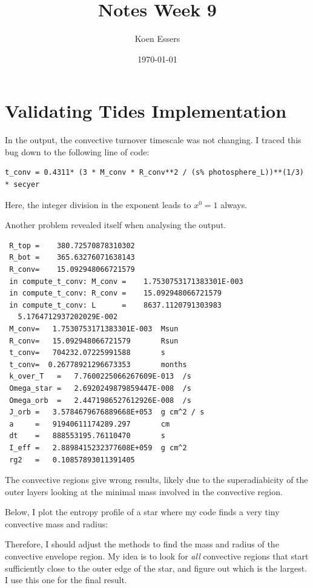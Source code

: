 \documentclass[a4paper,10pt]{article}
\title{Notes Week 9}
\author{Koen Essers}
\date{\today}
\begin{document}
\setuplayout
\section{Validating Tides Implementation}

In the output, the convective turnover timescale was not changing. I traced this bug down to the following line of code:
\begin{verbatim}
t_conv = 0.4311* (3 * M_conv * R_conv**2 / (s% photosphere_L))**(1/3) * secyer
\end{verbatim}
Here, the integer division in the exponent leads to \(x^0 = 1\) always.

Another problem revealed itself when analysing the output.
\begin{verbatim}
 R_top =    380.72570878310302     
 R_bot =    365.63276071638143     
 R_conv=    15.092948066721579     
 in compute_t_conv: M_conv =    1.7530753171383301E-003
 in compute_t_conv: R_conv =    15.092948066721579     
 in compute_t_conv: L      =    8637.1120791303983     
   5.1764712937202029E-002
 M_conv=   1.7530753171383301E-003  Msun
 R_conv=   15.092948066721579       Rsun
 t_conv=   704232.07225991588       s
 t_conv=  0.26778921296673353       months
 k_over_T   =   7.7600225066267609E-013  /s
 Omega_star =   2.6920249879859447E-008  /s
 Omega_orb  =   2.4471986527612926E-008  /s
 J_orb =   3.5784679676889668E+053  g cm^2 / s
 a     =   91940611174289.297       cm
 dt    =   888553195.76110470       s
 I_eff =   2.8898415232377608E+059  g cm^2
 rg2   =   0.10857893011391405     
\end{verbatim}

The convective regions give wrong results, likely due to the superadiabicity of the outer layers looking at the minimal mass involved in the convective region.

Below, I plot the entropy profile of a star where my code finds a very tiny convective mass and radius:
\begin{figure}[ht]
    \centering
\end{figure}

Therefore, I should adjust the methods to find the mass and radius of the convective envelope region.
My idea is to look for \emph{all} convective regions that start sufficiently close to the outer edge of the star, and figure out which is the largest. I use this one for the final result.
\end{document}
